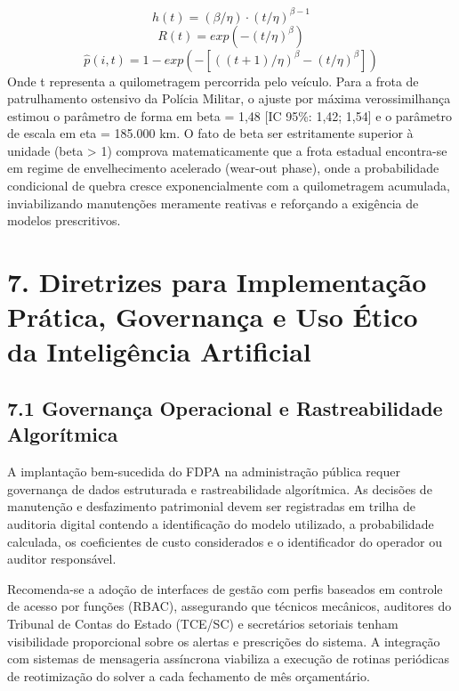 \documentclass[10pt,a4paper,journal]{article}
\begin{document}
\begin{equation}
h(t) = (\beta / \eta) \cdot (t / \eta)^{\beta - 1} \label{eq:9}
\end{equation}
\begin{equation}
R(t) = exp( - (t / \eta)^{\beta} ) \label{eq:10}
\end{equation}
\begin{equation}
\hat{p}(i, t) = 1 - exp( - [ ((t + 1) / \eta)^{\beta} - (t / \eta)^{\beta} ] ) \label{eq:11}
\end{equation}
Onde t representa a quilometragem percorrida pelo veículo. Para a frota de patrulhamento ostensivo da Polícia Militar, o ajuste por máxima verossimilhança estimou o parâmetro de forma em beta = 1,48 [IC 95\%: 1,42; 1,54] e o parâmetro de escala em eta = 185.000 km. O fato de beta ser estritamente superior à unidade (beta > 1) comprova matematicamente que a frota estadual encontra-se em regime de envelhecimento acelerado (wear-out phase), onde a probabilidade condicional de quebra cresce exponencialmente com a quilometragem acumulada, inviabilizando manutenções meramente reativas e reforçando a exigência de modelos prescritivos.

\section{7. Diretrizes para Implementação Prática, Governança e Uso Ético da Inteligência Artificial}
\subsection{7.1 Governança Operacional e Rastreabilidade Algorítmica}
A implantação bem-sucedida do FDPA na administração pública requer governança de dados estruturada e rastreabilidade algorítmica. As decisões de manutenção e desfazimento patrimonial devem ser registradas em trilha de auditoria digital contendo a identificação do modelo utilizado, a probabilidade calculada, os coeficientes de custo considerados e o identificador do operador ou auditor responsável.

Recomenda-se a adoção de interfaces de gestão com perfis baseados em controle de acesso por funções (RBAC), assegurando que técnicos mecânicos, auditores do Tribunal de Contas do Estado (TCE/SC) e secretários setoriais tenham visibilidade proporcional sobre os alertas e prescrições do sistema. A integração com sistemas de mensageria assíncrona viabiliza a execução de rotinas periódicas de reotimização do solver a cada fechamento de mês orçamentário.
\end{document}
